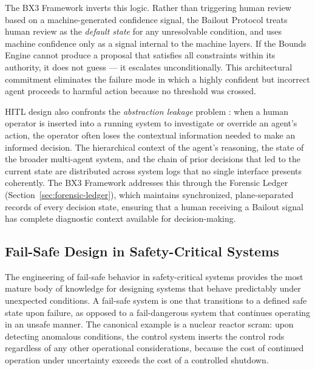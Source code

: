 \documentclass[12pt]{article}
\begin{document}
The BX3 Framework inverts this logic. Rather than triggering human review based on a machine-generated confidence signal, the Bailout Protocol treats human review as the \textit{default state} for any unresolvable condition, and uses machine confidence only as a signal internal to the machine layers. If the Bounds Engine cannot produce a proposal that satisfies all constraints within its authority, it does not guess --- it escalates unconditionally. This architectural commitment eliminates the failure mode in which a highly confident but incorrect agent proceeds to harmful action because no threshold was crossed.

HITL design also confronts the \textit{abstraction leakage} problem \cite{trist1981}: when a human operator is inserted into a running system to investigate or override an agent's action, the operator often loses the contextual information needed to make an informed decision. The hierarchical context of the agent's reasoning, the state of the broader multi-agent system, and the chain of prior decisions that led to the current state are distributed across system logs that no single interface presents coherently. The BX3 Framework addresses this through the Forensic Ledger (Section~\ref{sec:forensic-ledger}), which maintains synchronized, plane-separated records of every decision state, ensuring that a human receiving a Bailout signal has complete diagnostic context available for decision-making.

\subsection{Fail-Safe Design in Safety-Critical Systems}

The engineering of fail-safe behavior in safety-critical systems provides the most mature body of knowledge for designing systems that behave predictably under unexpected conditions. A fail-safe system is one that transitions to a defined safe state upon failure, as opposed to a fail-dangerous system that continues operating in an unsafe manner. The canonical example is a nuclear reactor scram: upon detecting anomalous conditions, the control system inserts the control rods regardless of any other operational considerations, because the cost of continued operation under uncertainty exceeds the cost of a controlled shutdown.
\end{document}
